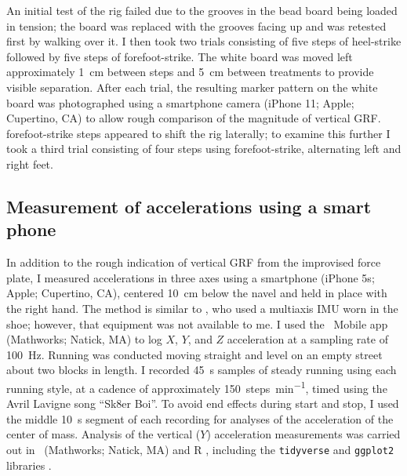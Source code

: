 An initial test of the rig failed due to the grooves in the bead board being loaded in tension; the board was replaced with the grooves facing up and was retested first by walking over it. I then took two trials consisting of five steps of heel-strike followed by five steps of forefoot-strike. The white board was moved left approximately \SI{1}{\centi\meter} between steps and \SI{5}{\centi\meter} between treatments to provide visible separation. After each trial, the resulting marker pattern on the white board was photographed using a smartphone camera (iPhone 11; Apple; Cupertino, CA) to allow rough comparison of the magnitude of vertical GRF. forefoot-strike steps appeared to shift the rig laterally; to examine this further I took a third trial consisting of four steps using forefoot-strike, alternating left and right feet. 




\subsection{Measurement of accelerations using a smart phone}
In addition to the rough indication of vertical GRF from the improvised force plate, I measured accelerations in three axes using a smartphone (iPhone 5s; Apple; Cupertino, CA), centered \SI{10}{\centi\meter} below the navel and held in place with the right hand. The method is similar to \citet{shiang2016determine}, who used a multiaxis IMU worn in the shoe; however, that equipment was not available to me. I used the \Matlab\ Mobile app (Mathworks; Natick, MA) to log $X$, $Y$, and $Z$ acceleration at a sampling rate of \SI{100}{\hertz}.  Running was conducted moving straight and level on an empty street about two blocks in length. I recorded \SI{45}{\second} samples of steady running using each running style, at a cadence of approximately \SI{150}{steps\per\minute}, timed using the Avril Lavigne song ``Sk8er Boi''. To avoid end effects during start and stop, I used the middle \SI{10}{\second} segment of each recording for analyses of the acceleration of the center of mass. Analysis of the vertical ($Y$) acceleration measurements was carried out in \Matlab\ (Mathworks; Natick, MA) and R \citep{r2020}, including the \lstinline{tidyverse} and \lstinline{ggplot2} libraries \citep{wickham2019tidyverse}. 



